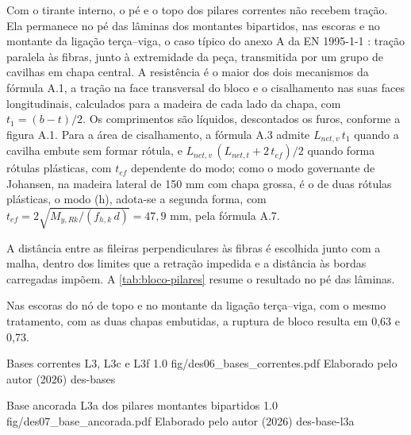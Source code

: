 Com o tirante interno, o pé e o topo dos pilares correntes não recebem tração.
Ela permanece no pé das lâminas dos montantes bipartidos, nas escoras e no
montante da ligação terça--viga, o caso típico do anexo A da EN 1995-1-1
\cite{EN1995-1-1:2004}: tração paralela às fibras, junto à extremidade da peça,
transmitida por um grupo de cavilhas em chapa central. A resistência é o maior
dos dois mecanismos da fórmula A.1, a tração na face transversal do bloco e o
cisalhamento nas suas faces longitudinais, calculados para a madeira de cada
lado da chapa, com $t_1 = (b - t)/2$. Os comprimentos são líquidos, descontados
os furos, conforme a figura A.1. Para a área de cisalhamento, a fórmula A.3
admite $L_{net,v}\,t_1$ quando a cavilha embute sem formar rótula, e
$L_{net,v}\,(L_{net,t} + 2\,t_{ef})/2$ quando forma rótulas plásticas, com
$t_{ef}$ dependente do modo; como o modo governante de Johansen, na madeira
lateral de 150 mm com chapa grossa, é o de duas rótulas plásticas, o modo (h),
adota-se a segunda forma, com $t_{ef} = 2\sqrt{M_{y,Rk}/(f_{h,k}\,d)} = 47{,}9$ mm,
pela fórmula A.7.

A distância entre as fileiras perpendiculares às fibras é escolhida junto com a
malha, dentro dos limites que a retração impedida e a distância às bordas
carregadas impõem. A \autoref{tab:bloco-pilares} resume o resultado no pé das
lâminas.


Nas escoras do nó de topo e no montante da ligação terça--viga, com o mesmo
tratamento, com as duas chapas embutidas, a ruptura de bloco resulta em 0,63 e
0,73.

\figura
{Bases correntes L3, L3c e L3f}
{1.0}
{fig/des06_bases_correntes.pdf}
{Elaborado pelo autor (2026)}
{des-bases}
{}
{}

\figura
{Base ancorada L3a dos pilares montantes bipartidos}
{1.0}
{fig/des07_base_ancorada.pdf}
{Elaborado pelo autor (2026)}
{des-base-l3a}
{}
{}

